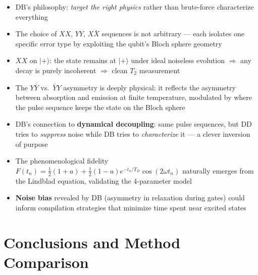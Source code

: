 \documentclass[10pt,a4paper]{article}
\begin{document}
\begin{insightbox}
\begin{itemize}
  \item DB's philosophy: \emph{target the right physics} rather than brute-force characterize everything
  \item The choice of $XX$, $YY$, $X\bar{X}$ sequences is not arbitrary --- each isolates one specific error type by exploiting the qubit's Bloch sphere geometry
  \item $XX$ on $|+\rangle$: the state remains at $|+\rangle$ under ideal noiseless evolution $\Rightarrow$ any decay is purely incoherent $\Rightarrow$ clean $T_2$ measurement
  \item The $Y\bar{Y}$ vs.\ $\bar{Y}Y$ asymmetry is deeply physical: it reflects the asymmetry between absorption and emission at finite temperature, modulated by where the pulse sequence keeps the state on the Bloch sphere
  \item DB's connection to \textbf{dynamical decoupling}: same pulse sequences, but DD tries to \emph{suppress} noise while DB tries to \emph{characterize} it --- a clever inversion of purpose
  \item The phenomenological fidelity $F(t_n) = \frac{1}{2}(1+a) + \frac{1}{2}(1-a)e^{-t_n/T_D}\cos(2\omega t_n)$ naturally emerges from the Lindblad equation, validating the 4-parameter model
  \item \textbf{Noise bias} revealed by DB (asymmetry in relaxation during gates) could inform compilation strategies that minimize time spent near excited states
\end{itemize}
\end{insightbox}

\newpage

\section{Conclusions and Method Comparison}
\end{document}
